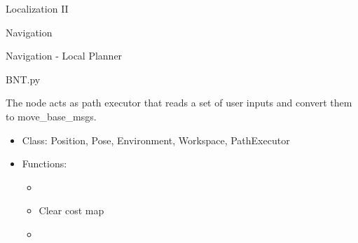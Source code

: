 \begin{frame}{Localization II}
\end{frame}
\begin{frame}{Navigation}
\end{frame}
\begin{frame}{Navigation - Local Planner}
\end{frame}
\begin{frame}{BNT.py}
    
    The node acts as path executor that reads  a set of user inputs and convert them to move\_base\_msgs.
    \begin{itemize}
        \item Class: Position, Pose, Environment, Workspace, PathExecutor
        
        \item Functions:
        \begin{itemize}
            \item 
            \item Clear cost map
            \item 
        \end{itemize}
    \end{itemize}
    
\end{frame}
